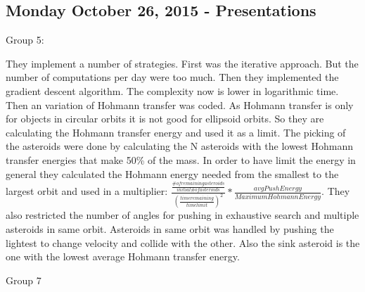 \subsection{Monday October 26, 2015 - Presentations}

Group 5:

They implement a number of strategies. First was the iterative approach. But the
number of computations per day were too much. Then they implemented the gradient
descent algorithm. The complexity now is lower in logarithmic time. Then an 
variation of Hohmann transfer was coded. As Hohmann transfer is only for objects
in circular orbits it is not good for ellipsoid orbits. So they are calculating 
the Hohmann transfer energy and used it as a limit. The picking of the asteroids
were done by calculating the N asteroids with the lowest Hohmann transfer energies
that make 50\% of the mass. In order to have limit the energy in general they 
calculated the Hohmann energy needed from the smallest to the largest orbit and
used in a multiplier: $\frac{\frac{\# of remaining asteroids}{initial \# of asteroids}}{(\frac{time remaining}{time limit})^2}*\frac{avgPush Energy}{Maximum Hohmann Energy}$.
They also restricted the number of angles for pushing in exhaustive search and
multiple asteroids in same orbit. Asteroids in same orbit was handled by pushing 
the lightest to change velocity and collide with the other. Also the sink asteroid 
is the one with the lowest average Hohmann transfer energy.

Group 7
